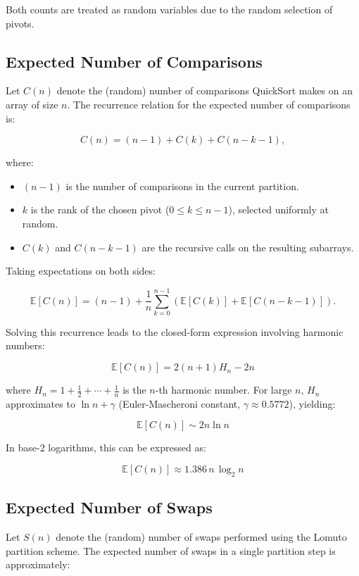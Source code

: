 \documentclass[pdflatex,sn-mathphys-num]{sn-jnl}%
\theoremstyle{thmstyleone}%
\theoremstyle{thmstyletwo}%
\theoremstyle{thmstylethree}%
\begin{document}
\begin{appendices}
Both counts are treated as random variables due to the random selection of pivots.

\subsection{Expected Number of Comparisons}

Let \( C(n) \) denote the (random) number of comparisons QuickSort makes on an array of size \( n \). The recurrence relation for the expected number of comparisons is:

\[
C(n) = (n - 1) + C(k) + C(n - k - 1),
\]

where:
\begin{itemize}
    \item \( (n - 1) \) is the number of comparisons in the current partition.
    \item \( k \) is the rank of the chosen pivot (\( 0 \leq k \leq n - 1 \)), selected uniformly at random.
    \item \( C(k) \) and \( C(n - k - 1) \) are the recursive calls on the resulting subarrays.
\end{itemize}

Taking expectations on both sides:

\[
\mathbb{E}[C(n)] = (n - 1) + \frac{1}{n} \sum_{k=0}^{n-1} \left( \mathbb{E}[C(k)] + \mathbb{E}[C(n - k - 1)] \right).
\]

Solving this recurrence leads to the closed-form expression involving harmonic numbers:

\[
\boxed{
\mathbb{E}[C(n)] = 2(n + 1) H_n - 2n
}
\]

where \( H_n = 1 + \frac{1}{2} + \cdots + \frac{1}{n} \) is the \( n \)-th harmonic number. For large \( n \), \( H_n \) approximates to \( \ln n + \gamma \) (Euler-Mascheroni constant, \( \gamma \approx 0.5772 \)), yielding:

\[
\mathbb{E}[C(n)] \sim 2n \ln n
\]

In base-2 logarithms, this can be expressed as:

\[
\mathbb{E}[C(n)] \approx 1.386\,n\,\log_2 n
\]

\subsection{Expected Number of Swaps}

Let \( S(n) \) denote the (random) number of swaps performed using the Lomuto partition scheme. The expected number of swaps in a single partition step is approximately:


\end{appendices}
\end{document}
